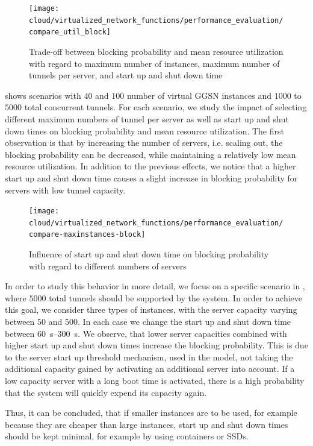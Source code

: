 \begin{figure}
  \centering
  \texttt{[image: cloud/virtualized\_network\_functions/performance\_evaluation/compare\_util\_block]}
  \caption{Trade-off between blocking probability and mean resource utilization with regard to maximum number of instances, maximum number of tunnels per server, and start up and shut down time}
  \label{fig:cloud_virtualized_network_functions:startup_shutdown:compare_util_block}
\end{figure}

 shows scenarios with \(40\) and \(100\) number of virtual \gls{GGSN} instances and  \(1000\) to \(5000\) total concurrent tunnels.
For each scenario, we study the impact of selecting different maximum numbers of tunnel per server as well as start up and shut down times on blocking probability and mean resource utilization.
The first observation is that by increasing the number of servers, i.e. scaling out, the blocking probability can be decreased, while maintaining a relatively low mean resource utilization.
In addition to the previous effects, we notice that a higher start up and shut down time causes a slight increase in blocking probability for servers with low tunnel capacity.

\begin{figure}
  \centering
  \texttt{[image: cloud/virtualized\_network\_functions/performance\_evaluation/compare-maxinstances-block]}
  \caption{Influence of start up and shut down time on blocking probability with regard to different numbers of servers}
  \label{fig:cloud_virtualized_network_functions:startup_shutdown:compare_maxinstances_block}
\end{figure}

In order to study this behavior in more detail, we focus on a specific scenario in , where \(5000\) total tunnels should be supported by the system.
In order to achieve this goal, we consider three types of instances, with the server capacity varying between \(50\) and \(500\).
In each case we change the start up and shut down time between \SIrange{60}{300}{\second}.
We observe, that lower server capacities combined with higher start up and shut down times increase the blocking probability.
This is due to the server start up threshold mechanism, used in the model, not taking the additional capacity gained by activating an additional server into account.
If a low capacity server with a long boot time is activated, there is a high probability that the system will quickly expend its capacity again.

Thus, it can be concluded, that if smaller instances are to be used, for example because they are cheaper than large instances, start up and shut down times should be kept minimal, for example by using containers or \glspl{SSD}.